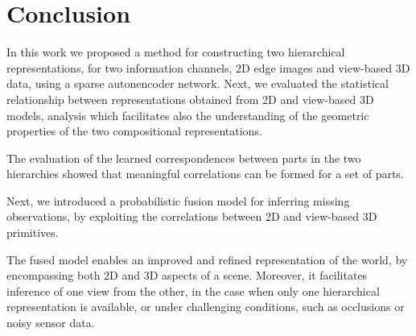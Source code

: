 \documentclass[runningheads]{llncs}
\begin{document}
\section{Conclusion}
 
In this work we proposed a method for constructing two hierarchical representations, for two information channels, 2D edge images and view-based 3D data, using a sparse autonencoder network. Next, we evaluated the statistical relationship between representations obtained from 2D and view-based 3D models, analysis which facilitates also the understanding of the geometric properties of the two compositional representations.

The evaluation of the learned correspondences between parts in the two hierarchies showed that meaningful correlations can be formed for a set of parts. 

Next, we introduced a probabilistic fusion model for inferring missing observations, by exploiting the correlations between 2D and view-based 3D primitives.
 
The fused model enables an improved and refined representation of the world, by encompassing both 2D and 3D aspects of a scene. Moreover, it facilitates inference of one view from the other, in the case when only one hierarchical representation is available, or under challenging conditions, such as occlusions or noisy sensor data. 



\end{document}
